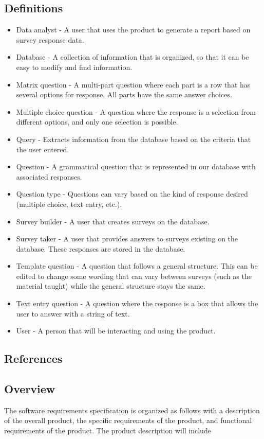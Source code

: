 \documentclass[letterpaper,10pt,titlepage, draftclsnofoot,onecolumn]{IEEEtran}
\begin{document}
\subsection{Definitions}
\begin{itemize}
\item Data analyst - A user that uses the product to generate a report based on survey response data.
\item Database - A collection of information that is organized, so that it can be easy to modify and find information. 
\item Matrix question - A multi-part question where each part is a row that has several options for response. All parts have the
same answer choices.
\item Multiple choice question - A question where the response is a selection from different options, and only one selection
is possible.
\item Query - Extracts information from the database based on the criteria that the user entered.
\item Question - A grammatical question that is represented in our database with associated responses.
\item Question type - Questions can vary based on the kind of response desired (multiple choice, text entry, etc.). %
\item Survey builder - A user that creates surveys on the database.
\item Survey taker - A user that provides answers to surveys existing on the database. These responses are stored in
the database.
\item Template question - A question that follows a general structure. This can be edited to change some wording that can
vary between surveys (such as the material taught) while the general structure stays the same.
\item Text entry question - A question where the response is a box that allows the user to answer with a string of text.
\item User - A person that will be interacting and using the product.
\end{itemize}
\subsection{References}
\subsection{Overview}
The software requirements specification is organized as follows with a description of the overall product, the specific requirements of the
product, and functional requirements of the product. The product description will include %
\end{document}
